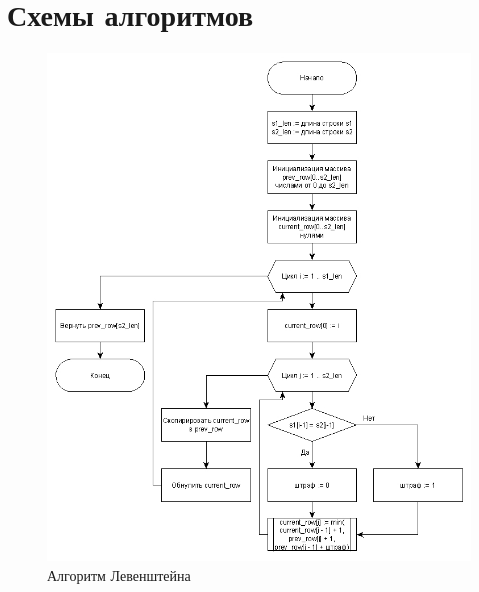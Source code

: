 \documentclass[14pt, a4paper]{report}
\begin{document}
	\section{Схемы алгоритмов}
	\begin{figure}[ht!]
		\centering
		\includegraphics[scale=0.5]{leven}
		\caption{Алгоритм Левенштейна}
		\label{fig:leven}
	\end{figure}
\end{document}
